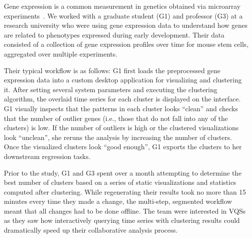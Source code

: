 \par\noindent{} Gene expression is a common measurement in genetics obtained via microarray experiments~\cite{Peng2016}.  We worked with a graduate student (G1) and professor (G3) at a research university who were using gene expression data to understand how genes are related to phenotypes expressed during early development. Their data consisted of a collection of gene expression profiles over time for mouse stem cells, aggregated over multiple experiments. %
\par Their typical workflow is as follows: G1 first loads the preprocessed gene expression data into a custom desktop application for visualizing and clustering it. After setting several system parameters and executing the clustering algorithm, the overlaid time series for each cluster is displayed on the interface. G1 visually inspects that the patterns in each cluster looks ``clean'' and checks that the number of outlier genes (i.e., those that do not fall into any of the clusters) is low.  If the number of outliers is high or the clustered visualizations look ``unclean'', she reruns the analysis by increasing the number of clusters. Once the visualized clusters look ``good enough'', G1 exports the clusters to her downstream regression tasks.
\par Prior to the study, G1 and G3 spent over a month attempting to determine the best number of clusters based on a series of static visualizations and statistics computed after clustering. While regenerating their results took no more than 15 minutes every time they made a change, the multi-step, segmented workflow meant that all changes had to be done offline. The team were interested in VQSs as they saw how interactively querying time series with clustering results could dramatically speed up their collaborative analysis process.
